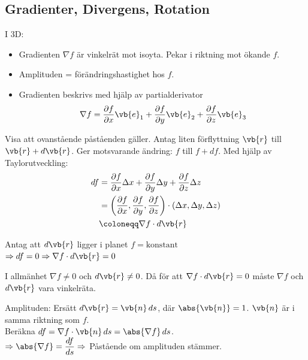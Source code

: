 \subsection{Gradienter, Divergens, Rotation}
I 3D:

\begin{minipage}{0.36\linewidth}
\end{minipage}
\begin{minipage}{0.62\linewidth}
\begin{itemize}
  \item Gradienten $\nabla f$ är vinkelrät mot isoyta. Pekar i riktning mot ökande $f$.
  \item Amplituden = förändringshastighet hos $f$.
  \item Gradienten beskrivs med hjälp av partialderivator
  \[ \nabla f = \frac{\partial f}{\partial x}\vb{e}_1 + \frac{\partial f}{\partial y}\vb{e}_2 + \frac{\partial f}{\partial z}\vb{e}_3 \]
\end{itemize}
\end{minipage}

Visa att ovanstående påståenden gäller. Antag liten förflyttning $\vb{r}$ till $\vb{r} + d\vb{r}$. Ger motsvarande ändring: $f$ till $f + df$. Med hjälp av Taylorutveckling:
\begin{align*}
df &= \frac{\partial f}{\partial x}\Delta x + \frac{\partial f}{\partial y}\Delta y + \frac{\partial f}{\partial z}\Delta z \\
&= \left( \frac{\partial f}{\partial x}, \frac{\partial f}{\partial y}, \frac{\partial f}{\partial z} \right) \cdot (\Delta x, \Delta y, \Delta z) \\
&\coloneqq \nabla f \cdot d\vb{r}
\end{align*}

Antag att $d\vb{r}$ ligger i planet $f = \text{konstant}$\\
$\Rightarrow df = 0 \Rightarrow \nabla f \cdot d\vb{r} = 0$

I allmänhet $\nabla f \neq 0$ och $d\vb{r} \neq 0$. Då för att $\nabla f \cdot d\vb{r} = 0$ måste $\nabla f$ och $d\vb{r}$ vara vinkelräta.

Amplituden: Ersätt $d\vb{r} = \vb{n}\,ds$, där $\abs{\vb{n}} = 1$. $\vb{n}$ är i samma riktning som $f$.\\
Beräkna $df = \nabla f \cdot \vb{n}\,ds = \abs{\nabla f}\,ds$.\\
$\Rightarrow \abs{\nabla f} = \dfrac{df}{ds} \Rightarrow$ Påstående om amplituden stämmer.
